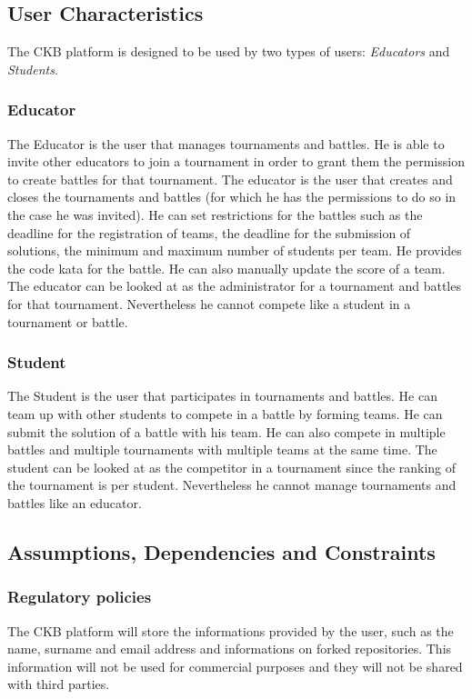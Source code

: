 \subsection{User Characteristics}
The CKB platform is designed to be used by two types of users: \textit{Educators} and \textit{Students}.

\subsubsection{Educator}
The Educator is the user that manages tournaments and battles. He is able to invite other educators to join a tournament in order to grant them the permission to create battles for that tournament.
The educator is the user that creates and closes the tournaments and battles (for which he has the permissions to do so in the case he was invited).
He can set restrictions for the battles such as the deadline for the registration of teams, the deadline for the submission of solutions, the minimum and maximum number of students per team. He provides the code kata for the battle. He can also manually update the score of a team. The educator can be looked at as the administrator for a tournament and battles for that tournament. Nevertheless he cannot compete like a student in a tournament or battle.

\subsubsection{Student}
The Student is the user that participates in tournaments and battles. He can team up with other students to compete in a battle by forming teams. He can submit the solution of a battle with his team. He can also compete in multiple battles and multiple tournaments with multiple teams at the same time. The student can be looked at as the competitor in a tournament since the ranking of the tournament is per student. Nevertheless he cannot manage tournaments and battles like an educator.

\subsection{Assumptions, Dependencies and Constraints}

\subsubsection{Regulatory policies}
The CKB platform will store the informations provided by the user, such as the name, surname and email address and informations on forked repositories. This information will not be used for commercial purposes and they will not be shared with third parties.

